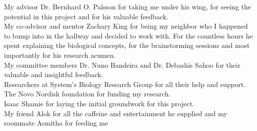 \begin{frontmatter}
%
\tableofcontents
\listoffigures  %
\listoftables   %



%
%
\begin{acknowledgements}
 My advisor Dr. Bernhard O. Palsson for taking me under his wing, for seeing the potential in this project and for his valuable feedback.  \\
 My co-advisor and mentor Zachary King for being my neighbor who I happened to bump into in the hallway and decided to work with. For the countless hours he spent explaining the biological concepts, for the brainstorming sessions and most importantly for his research acumen.\\
 My committee members Dr. Nuno Bandeira and Dr. Debashis Sahoo for their valuable and insightful feedback.\\ 
 Researchers at System's Biology Research Group for all their help and support.\\
 The Novo Nordisk foundation for funding my research. \\
 Isaac Shamie for laying the initial groundwork for this project.\\
 My friend Alok for all the caffeine and entertainment he supplied and my roommate Asmitha for feeding me\\
 
\end{acknowledgements}


%
%



\end{frontmatter}
